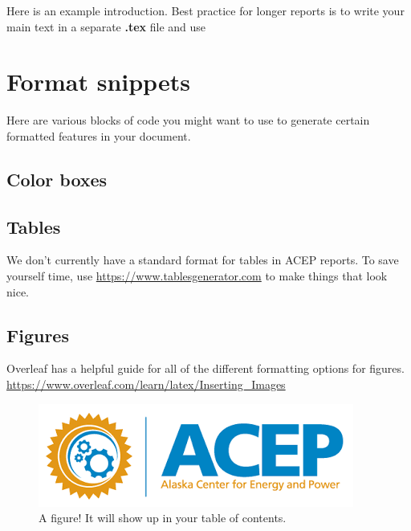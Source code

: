 Here is an example introduction. Best practice for longer reports is to write your main text in a separate \textbf{.tex} file and use 

\section{Format snippets}
Here are various blocks of code you might want to use to generate certain formatted features in your document. 

\subsection{Color boxes}
\begin{center}
\end{center}


\subsection{Tables}
We don't currently have a standard format for tables in ACEP reports. To save yourself time, use \url{https://www.tablesgenerator.com} to make things that look nice. 

\subsection{Figures}
Overleaf has a helpful guide for all of the different formatting options for figures. \url{https://www.overleaf.com/learn/latex/Inserting_Images}

\begin{figure}
    \centering
    \includegraphics[width=\textwidth]{Figures/ACEP-logo-sm.png}
    \caption{A figure! It will show up in your table of contents.}
    \label{fig:enter-label}
\end{figure}

